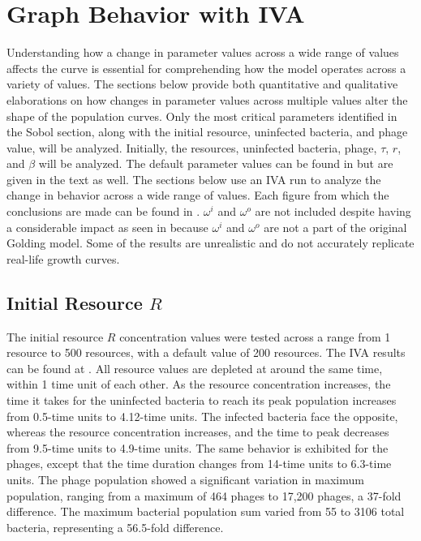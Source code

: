 \section{Graph Behavior with IVA}
\label{sec:results:graph_behavior}
Understanding how a change in parameter values across a wide range of values affects the curve is essential for comprehending how the model operates across a variety of values. 
The sections below provide both quantitative and qualitative elaborations on how changes in parameter values across multiple values alter the shape of the population curves. 
Only the most critical parameters identified in the Sobol section, along with the initial resource, uninfected bacteria, and phage value, will be analyzed. 
Initially, the resources, uninfected bacteria, phage, $\tau$, $r$, and $\beta$ will be analyzed. 
The default parameter values can be found in  but are given in the text as well. 
The sections below use an IVA run to analyze the change in behavior across a wide range of values. 
Each figure from which the conclusions are made can be found in . 
$\omega^i$ and $\omega^o$ are not included despite having a considerable impact as seen in  because $\omega^i$ and $\omega^o$ are not a part of the original Golding model. 
Some of the results are unrealistic and do not accurately replicate real-life growth curves. 

\subsection{Initial Resource $R$}
The initial resource $R$ concentration values were tested across a range from 1 resource to 500 resources, with a default value of 200 resources. 
The IVA results can be found at . 
All resource values are depleted at around the same time, within 1 time unit of each other. 
As the resource concentration increases, the time it takes for the uninfected bacteria to reach its peak population increases from 0.5-time units to 4.12-time units. 
The infected bacteria face the opposite, whereas the resource concentration increases, and the time to peak decreases from 9.5-time units to 4.9-time units. 
The same behavior is exhibited for the phages, except that the time duration changes from 14-time units to 6.3-time units. 
The phage population showed a significant variation in maximum population, ranging from a maximum of 464 phages to 17,200 phages, a 37-fold difference. 
The maximum bacterial population sum varied from 55 to 3106 total bacteria, representing a 56.5-fold difference. 

